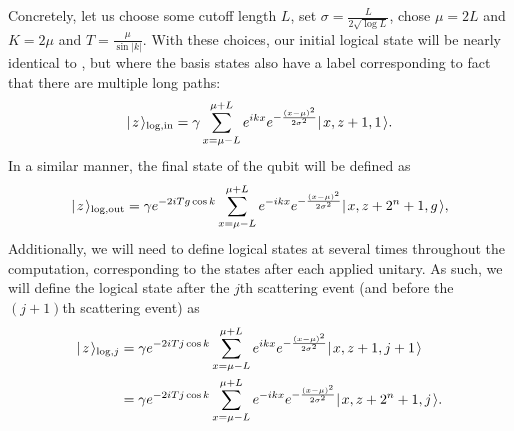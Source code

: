 \documentclass[../thesis-main/thesis-main]{subfiles}
\begin{document}
  
Concretely, let us choose some cutoff length $L$, set $\sigma = \frac{L}{2\sqrt{\log L}}$, chose $\mu = 2L$ and $K = 2\mu$ and $T = \frac{\mu}{\sin |k|}$.  With these choices, our initial logical state will be nearly identical to , but where the basis states also have a label corresponding to fact that there are multiple long paths:
\begin{align}
  |\mspace{2mu} z \mspace{2mu} \rangle_{\text{log},\text{in}} = \gamma \sum_{x = \mu - L}^{\mu + L} e^{ i k x} e^{ - \frac{(x-\mu)^2}{2\sigma^2}} |\mspace{2mu} x,z+1,1 \mspace{2mu} \rangle.
\end{align}
In a similar manner, the final state of the qubit will be defined as
 \begin{align}
  |\mspace{2mu} z \mspace{2mu} \rangle_{\text{log},\text{out}} = \gamma e^{- 2 i Tg \cos k} \sum_{x = \mu - L}^{\mu + L} e^{ -i k x} e^{ - \frac{(x-\mu)^2}{2\sigma^2}} |\mspace{2mu} x,z+2^{n}+1,g \mspace{2mu} \rangle,
\end{align}
Additionally, we will need to define logical states at several times throughout the computation, corresponding to the states after each applied unitary.  As such, we will define the logical state after the $j$th scattering event (and before the $(j+1)$th scattering event) as
\begin{align}
  |\mspace{2mu} z \mspace{2mu} \rangle_{\text{log},j} &= \gamma e^{-2i Tj \cos k}\sum_{x = \mu - L}^{\mu + L} e^{ i k x} e^{ - \frac{(x-\mu)^2}{2\sigma^2}} |\mspace{2mu} x,z+1,j+1 \mspace{2mu} \rangle \\
  &= \gamma e^{- 2 i Tj \cos k} \sum_{x = \mu - L}^{\mu + L} e^{ -i k x} e^{ - \frac{(x-\mu)^2}{2\sigma^2}} |\mspace{2mu} x,z+2^n+1,j \mspace{2mu} \rangle.
\end{align}
\end{document}
